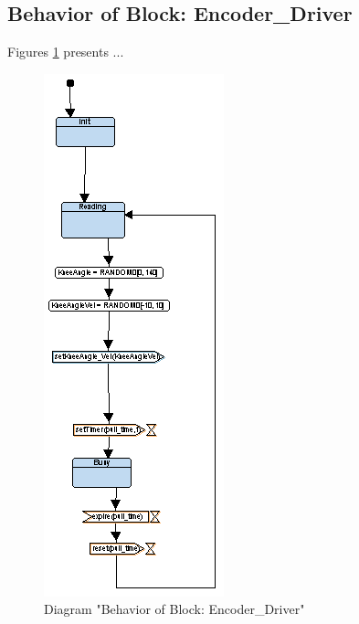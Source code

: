 \subsection{Behavior of Block: Encoder\_Driver}
Figures \ref{fig:EncoderDriverEncoderDriver24} presents ...
\begin{figure}[htb]
\centering
\includegraphics[width=\textwidth]{img_2_4.png}
\caption{Diagram "Behavior of Block: Encoder\_Driver"}
\label{fig:EncoderDriverEncoderDriver24}
\end{figure}

